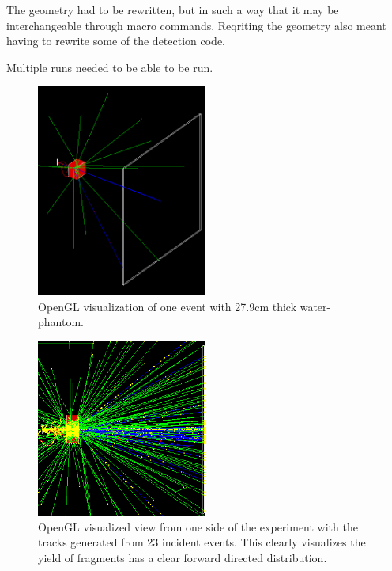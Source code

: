 The geometry had to be rewritten, but in such a way that it may be interchangeable through macro commands. Reqriting the geometry also meant having to rewrite some of the detection code.

Multiple runs needed to be able to be run.


\begin{figure}[ht] 
\begin{center}
\includegraphics[width=0.5\textwidth]{images/oneEvent.png}  
\caption{\label{fig:oneEvent} OpenGL visualization of one event with 27.9cm thick water-phantom.}
\end{center}
\end{figure}

\begin{figure}[ht] 
\begin{center}
\includegraphics[width=0.5\textwidth]{images/twentyEvents.png}  
\caption{\label{fig:twentyEvents} OpenGL visualized view from one side of the experiment with the tracks generated from 23 incident events. This clearly visualizes the yield of fragments has a clear forward directed distribution.}
\end{center}
\end{figure}


